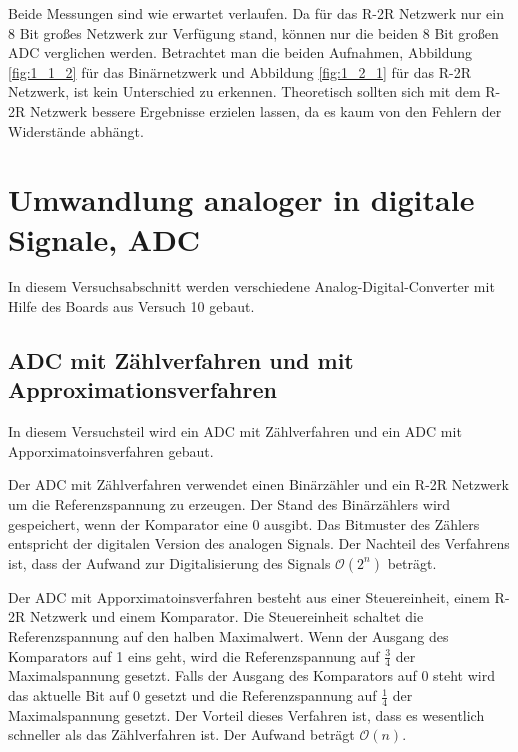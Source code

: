 \documentclass[12pt,a4paper]{article}
\begin{document}
Beide Messungen sind wie erwartet verlaufen. Da für das R-2R Netzwerk nur ein 8 Bit großes Netzwerk zur Verfügung stand, können nur die beiden 8 Bit großen ADC verglichen werden. Betrachtet man die beiden Aufnahmen, Abbildung \ref{fig:1_1_2} für das Binärnetzwerk und Abbildung \ref{fig:1_2_1} für das R-2R Netzwerk, ist kein Unterschied zu erkennen. Theoretisch sollten sich mit dem R-2R Netzwerk bessere Ergebnisse erzielen lassen, da es kaum von den Fehlern der Widerstände abhängt.



\section{Umwandlung analoger in digitale Signale, ADC}

In diesem Versuchsabschnitt werden verschiedene Analog-Digital-Converter mit Hilfe des Boards aus Versuch 10 gebaut.

\subsection{ADC mit Zählverfahren und mit Approximationsverfahren}

In diesem Versuchsteil wird ein ADC mit Zählverfahren und ein ADC mit Apporximatoinsverfahren gebaut.

Der ADC mit Zählverfahren verwendet einen Binärzähler und ein R-2R Netzwerk um die Referenzspannung zu erzeugen. Der Stand des Binärzählers wird gespeichert, wenn der Komparator eine 0 ausgibt. Das Bitmuster des Zählers entspricht der digitalen Version des analogen Signals. Der Nachteil des Verfahrens ist, dass der Aufwand zur Digitalisierung des Signals $\mathcal O(2^n)$ beträgt.

Der ADC mit Apporximatoinsverfahren besteht aus einer Steuereinheit, einem R-2R Netzwerk und einem Komparator. Die Steuereinheit schaltet die Referenzspannung auf den halben Maximalwert. Wenn der Ausgang des Komparators auf 1 eins geht, wird die Referenzspannung auf $\frac{3}{4}$ der Maximalspannung gesetzt. Falls der Ausgang des Komparators auf 0 steht wird das aktuelle Bit auf 0 gesetzt und die Referenzspannung auf $\frac{1}{4}$ der Maximalspannung gesetzt. Der Vorteil dieses Verfahren ist, dass es wesentlich schneller als das Zählverfahren ist. Der Aufwand beträgt $\mathcal O(n)$.
\end{document}
